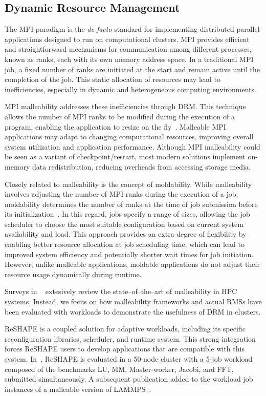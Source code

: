 \documentclass[a4paper,fleqn]{cas-dc}
\begin{document}
\subsection{Dynamic Resource Management}
The MPI paradigm is the {\it de facto} standard for implementing distributed parallel applications designed to run on computational clusters. MPI provides efficient and straightforward mechanisms for communication among different processes, known as ranks, each with its own memory address space.
In a traditional MPI job, a fixed number of ranks are initiated at the start and remain active until the completion of the job. This static allocation of resources may lead to inefficiencies, especially in dynamic and heterogeneous computing environments.

MPI malleability addresses these inefficiencies through DRM. This technique allows the number of MPI ranks to be modified during the execution of a program, enabling the application to resize on the fly~\cite{feitelson_packing_1996}. Malleable MPI applications may adapt to changing computational resources, improving overall system utilization and application performance.
Although MPI malleability could be seen as a variant of checkpoint/restart, most modern solutions implement on-memory data redistribution, reducing overheads from accessing storage media.

Closely related to malleability is the concept of moldability. While malleability involves adjusting the number of MPI ranks during the execution of a job, moldability determines the number of ranks at the time of job submission before its initialization~\cite{lublin_workload_2003}. 
In this regard, jobs specify a range of sizes, allowing the job scheduler to choose the most suitable configuration based on current system availability and load.
This approach provides an extra degree of flexibility by enabling better resource allocation at job scheduling time, which can lead to improved system efficiency and potentially shorter wait times for job initiation. However, unlike malleable applications, moldable applications do not adjust their resource usage dynamically during runtime.

Surveys in ~\cite{aliaga_survey_2022, Tarraf_malleability_2024} extesively review the state--of--the--art of malleability in HPC systems. Instead, we focus on how malleability frameworks and actual RMSs have been evaluated with workloads to demonstrate the usefulness of DRM in clusters.

ReSHAPE is a coupled solution for adaptive workloads, including its specific reconfiguration libraries, scheduler, and runtime system.
This strong integration forces ReSHAPE users to develop applications that are compatible with this system.
In~\cite{sudarsan_reshape_2007}, ReSHAPE is evaluated in a 50-node cluster with a 5-job workload composed of the benchmarks LU, MM, Master-worker, Jacobi, and FFT, submitted simultaneously.
A subsequent publication added to the workload job instances of a malleable version of LAMMPS~\cite{sudarsan_dynamic_2009}.
\end{document}
